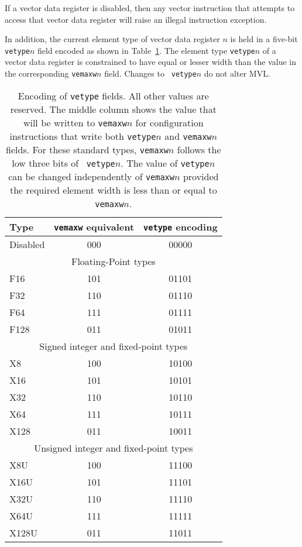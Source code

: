 If a vector data register is disabled, then any vector instruction
that attempts to access that vector data register will raise an
illegal instruction exception.

In addition, the current element type of vector data register $n$ is
held in a five-bit {\tt vetype}$n$ field encoded as shown in
Table~\ref{tab:vetype}.  The element type {\tt vetype}$n$ of a vector
data register is constrained to have equal or lesser width than the
value in the corresponding {\tt vemaxw}$n$ field.  Changes to {\tt
  vetype}$n$ do not alter MVL.

\begin{table}[hbt]
  \centering
  \begin{tabular}{|l|c|c|}
    \hline
    Type & {\tt vemaxw} equivalent & {\tt vetype} encoding \\
    \hline
    Disabled & 000 & 00000 \\
    \hline
    \hline
    \multicolumn{3}{|c|}{Floating-Point types} \\
    \hline
    F16      & 101 & 01101 \\
    F32      & 110 & 01110 \\
    F64      & 111 & 01111 \\
    F128     & 011 & 01011 \\
    \hline
    \hline
    \multicolumn{3}{|c|}{Signed integer and fixed-point types} \\
    \hline
    X8       & 100 & 10100  \\
    X16      & 101 & 10101  \\
    X32      & 110 & 10110  \\
    X64      & 111 & 10111  \\
    X128     & 011 & 10011  \\
    \hline
    \hline
    \multicolumn{3}{|c|}{Unsigned integer and fixed-point types} \\
    \hline
    X8U      & 100 & 11100  \\
    X16U     & 101 & 11101  \\
    X32U     & 110 & 11110  \\
    X64U     & 111 & 11111  \\
    X128U    & 011 & 11011  \\
    \hline
  \end{tabular}
  \caption{Encoding of {\tt vetype} fields.  All other values are
    reserved. The middle column shows the value that will be written
    to {\tt vemaxw}$n$ for configuration instructions that write both
    {\tt vetype}$n$ and {\tt vemaxw}$n$ fields. For these standard
    types, {\tt vemaxw}$n$ follows the low three bits of {\tt
      vetype}$n$. The value of {\tt vetype}$n$ can be changed
    independently of {\tt vemaxw}$n$ provided the required element
    width is less than or equal to {\tt vemaxw}$n$.}
  \label{tab:vetype}
\end{table}

